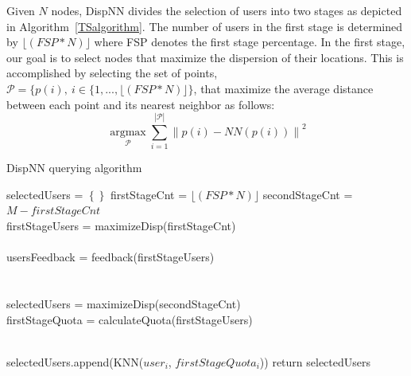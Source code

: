 \documentclass{acm_proc_article-sp}
\newcommand\floor[1]{\lfloor#1\rfloor}
\DeclareMathOperator*{\argmax}{argmax}
\newcommand{\norm}[1]{\left\lVert #1 \right\rVert}
\begin{document}
Given $N$ nodes, DispNN divides the selection of users into two stages as depicted in Algorithm~\ref{TSalgorithm}. The number of users in the first stage is determined by $\floor{(FSP*N)}$ where FSP denotes the first stage percentage.
In the first stage, our goal is to select nodes that maximize the dispersion of their locations. This is accomplished by selecting the set of points, $\mathcal{P} = \{ p(i), \ i \in \{ 1,..., \floor{(FSP*N)} \}$, that maximize the average distance between each point and its nearest neighbor as follows:
\begin{equation} \label{eq:maxDisp}
\argmax\limits_{\mathcal{P}} \sum_{i=1}^{|\mathcal{P} |} \norm{p(i) - NN(p(i))}^2
\end{equation}
\begin{algorithm}
\caption{DispNN querying algorithm}
\label{TSalgorithm}
\begin{algorithmic}[1]
       \State selectedUsers = $\left\{\right\}$
       \State firstStageCnt = $\floor{(FSP*N)}$
       \State secondStageCnt = $M - firstStageCnt$\\
     
       \State firstStageUsers = maximizeDisp(firstStageCnt)\\
       \\
       \State usersFeedback = feedback(firstStageUsers)\\
        \\
       \\
        
              \State selectedUsers = maximizeDisp(secondStageCnt){}
       \Else
       \EndIf {}\\
     \State firstStageQuota = calculateQuota(firstStageUsers)
    
     \\ 
   \State selectedUsers.append(KNN($user_i$, $firstStageQuota_i$))
 \EndFor
\State return {selectedUsers}
\EndFunction
\end{algorithmic}
\end{algorithm}
\end{document}
